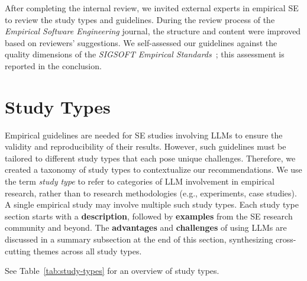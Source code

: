 \documentclass[smallextended]{svjour3}
\newif\ifpaper\papertrue
\newcommand{\studytypes}{\hyperref[sec:study-types]{\emph{Study Types}}\xspace}
\newcommand{\studytypes}{\href{/study-types}{\emph{Study Types}}\xspace}
\newcommand{\guidelines}{\hyperref[sec:guidelines]{\emph{Guidelines}}\xspace}
\newcommand{\guidelines}{\href{/guidelines}{\emph{Guidelines}}\xspace}
\begin{document}
After completing the internal review, we invited external experts in empirical SE to review the study types and guidelines.
During the review process of the \emph{Empirical Software Engineering} journal, the structure and content were improved based on reviewers' suggestions.
We self-assessed our guidelines against the quality dimensions of the \emph{SIGSOFT Empirical Standards}~\citep{ralph2021empiricalstandardssoftwareengineering}; this assessment is reported in the conclusion.


\section{Study Types}
\label{sec:study-types}

Empirical guidelines are needed for SE studies involving LLMs to ensure the validity and reproducibility of their results.
However, such guidelines must be tailored to different study types that each pose unique challenges.
Therefore, we created a taxonomy of study types to contextualize our recommendations.
We use the term \emph{study type} to refer to categories of LLM involvement in empirical research, rather than to research methodologies (e.g., experiments, case studies). A single empirical study may involve multiple such study types.
Each study type section starts with a \textbf{description}, followed by \textbf{examples} from the SE research community and beyond. The \textbf{advantages} and \textbf{challenges} of using LLMs are discussed in a summary subsection at the end of this section, synthesizing cross-cutting themes across all study types.
\ifpaper
See Table~\ref{tab:study-types} for an overview of study types.
\fi
 
\end{document}

